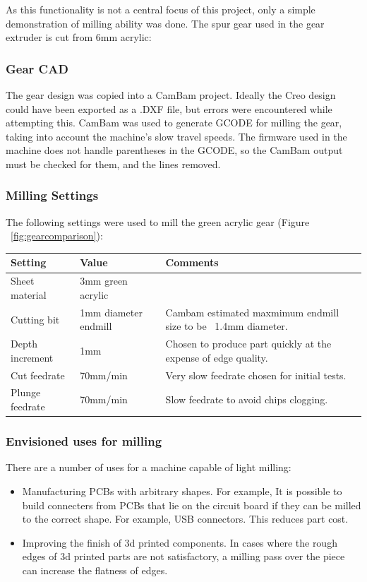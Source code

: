 \documentclass[a4paper,11pt]{article}  %
\begin{document}
As this functionality is not a central focus of this project, only a simple demonstration of milling ability was done. The spur gear used in the gear extruder is cut from 6mm acrylic:

\subsubsection {Gear CAD}
The gear design was copied into a CamBam project. Ideally the Creo design could have been exported as a .DXF file, but errors were encountered while attempting this. CamBam was used to 
generate GCODE for milling the gear, taking into account the machine's slow travel speeds. The firmware used in the machine does not handle parentheses in the GCODE, so the CamBam 
output must be checked for them, and the lines removed.

\subsubsection {Milling Settings}

The following settings were used to mill the green acrylic gear (Figure ~\ref{fig:gearcomparison}):

\begin{center}
	\begin{tabular}{| l | l | p{8cm} |}
	\hline
	Setting & Value & Comments \\ \hline
	Sheet material & 3mm green acrylic & \\ \hline
	Cutting bit & 1mm diameter endmill & Cambam estimated maxmimum endmill size to be ~1.4mm diameter. \\ \hline
	Depth increment & 1mm & Chosen to produce part quickly at the expense of edge quality. \\ \hline
	Cut feedrate & 70mm/min & Very slow feedrate chosen for initial tests. \\ \hline
	Plunge feedrate & 70mm/min & Slow feedrate to avoid chips clogging.\\
	\hline
	\end{tabular}
\end{center}

\subsubsection {Envisioned uses for milling}
{
There are a number of uses for a machine capable of light milling:

\begin{itemize} \itemsep0em
	\item	Manufacturing PCBs with arbitrary shapes. For example, It is possible to build connecters from PCBs that lie on the circuit board if they can be milled to the correct shape.
			For example, USB connectors. This reduces part cost.
	\item	Improving the finish of 3d printed components. In cases where the rough edges of 3d printed parts are not satisfactory, a milling pass over the piece can increase the flatness
			of edges.
	
\end{itemize}
}
\end{document}
